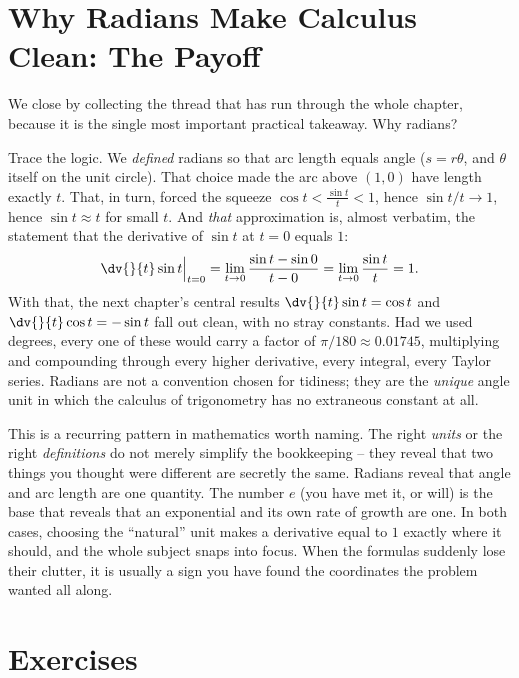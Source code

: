 \section{Why Radians Make Calculus Clean: The Payoff}
\label{ch04:why-radians}

We close by collecting the thread that has run through the whole chapter, because it is the single most important practical takeaway. Why radians?

Trace the logic. We \emph{defined} radians so that arc length equals angle ($s = r\theta$, and $\theta$ itself on the unit circle). That choice made the arc above $(1,0)$ have length exactly $t$. That, in turn, forced the squeeze $\cos t < \tfrac{\sin t}{t} < 1$, hence $\sin t/t \to 1$, hence $\sin t \approx t$ for small $t$. And \emph{that} approximation is, almost verbatim, the statement that the derivative of $\sin t$ at $t=0$ equals $1$:
\[
  \dv{}{t}\sin t \Big|_{t=0} = \lim_{t\to 0}\frac{\sin t - \sin 0}{t - 0} = \lim_{t\to 0}\frac{\sin t}{t} = 1.
\]
With that, the next chapter's central results $\dv{}{t}\sin t = \cos t$ and $\dv{}{t}\cos t = -\sin t$ fall out clean, with no stray constants. Had we used degrees, every one of these would carry a factor of $\pi/180 \approx 0.01745$, multiplying and compounding through every higher derivative, every integral, every Taylor series. Radians are not a convention chosen for tidiness; they are the \emph{unique} angle unit in which the calculus of trigonometry has no extraneous constant at all.

\begin{aestheticbox}
This is a recurring pattern in mathematics worth naming. The right \emph{units} or the right \emph{definitions} do not merely simplify the bookkeeping -- they reveal that two things you thought were different are secretly the same. Radians reveal that angle and arc length are one quantity. The number $e$ (you have met it, or will) is the base that reveals that an exponential and its own rate of growth are one. In both cases, choosing the ``natural'' unit makes a derivative equal to $1$ exactly where it should, and the whole subject snaps into focus. When the formulas suddenly lose their clutter, it is usually a sign you have found the coordinates the problem wanted all along.
\end{aestheticbox}

\section{Exercises}
\label{ch04:exercises}

